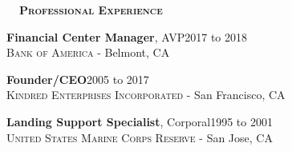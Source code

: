 \documentclass[hidelinks, 10.5pt]{article}
\def\contentwidth{0.9\linewidth}    %
\def\contentblockspacing{2.5mm}     %
\def\contentheaderspacing{1mm}      %
\def\sectionspacing{8mm}            %
\def\sectiontocontentspacing{4mm}   %
\renewcommand{\section}[1]{
    {\fontsize{14}{14}\selectfont \textsc{\textbf{\ \ #1\ \ }}}\hrulefill
}
\begin{document}
{\vspace{-2mm}



\vspace{\sectionspacing}
\section{Professional Experience}

\vspace{\sectiontocontentspacing}

\begin{minipage}[ct]{\contentwidth}
    \textbf{Financial Center Manager}, AVP\hfill 2017 to 2018\\
    {\textsc{Bank of America} - Belmont, CA}
\end{minipage}

\vspace{\contentblockspacing}

\begin{minipage}[ct]{\contentwidth}
    \textbf{Founder/CEO}\hfill 2005 to 2017\\
    {\textsc{Kindred Enterprises Incorporated} - San Francisco, CA}
\end{minipage}

\vspace{\contentblockspacing}

\begin{minipage}[ct]{\contentwidth}
    \textbf{Landing Support Specialist}, Corporal\hfill 1995 to 2001\\
    {\textsc{United States Marine Corps Reserve} - San Jose, CA}
\end{minipage}

}
\end{document}
